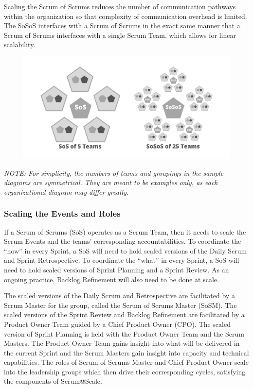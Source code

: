 \documentclass[12pt,a4paper,parskip=full]{scrartcl}
\begin{document}
Scaling the Scrum of Scrums reduces the number of communication pathways
within the organization so that complexity of communication overhead is
limited. The SoSoS interfaces with a Scrum of Scrums in the exact same
manner that a Scrum of Scrums interfaces with a single Scrum Team, which
allows for linear scalability.

\begin{figure}[H]
    \centering
    \includegraphics[scale=0.15]{2.png}
  
\end{figure}

\emph{NOTE: For simplicity, the numbers of teams and groupings in the
sample diagrams are symmetrical. They are meant to be examples only, as
each organizational diagram may differ greatly.}

\subsubsection{Scaling the Events and
Roles}\label{scaling-the-events-and-roles}

If a Scrum of Scrums (SoS) operates as a Scrum Team, then it needs to scale the Scrum Events and the teams' corresponding accountabilities. To coordinate the ``how'' in every Sprint, a SoS will need to hold scaled versions of the Daily Scrum and Sprint Retrospective. To coordinate the ``what'' in every Sprint, a SoS will need to hold scaled versions of Sprint Planning and a Sprint Review. As an ongoing practice, Backlog Refinement will also need to be done at scale.

The scaled versions of the Daily Scrum and Retrospective are facilitated by a Scrum Master for the group, called the Scrum of Scrums Master (SoSM). The scaled versions of the Sprint Review and Backlog Refinement are facilitated by a Product Owner Team guided by a Chief Product Owner (CPO). The scaled version of Sprint Planning is held with the Product Owner Team and the Scrum Masters. The Product Owner Team gains insight into what will be delivered in the current Sprint and the Scrum Masters gain insight into capacity and technical capabilities. The roles of Scrum of Scrums Master and Chief Product Owner scale into the leadership groups which then drive their corresponding cycles, satisfying the components of Scrum@Scale.
\end{document}
